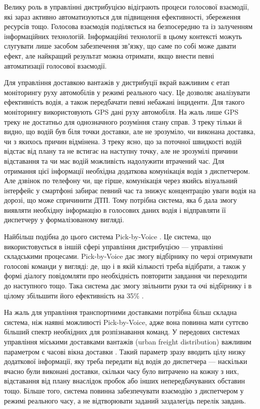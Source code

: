 Велику роль в управлінні дистрибуцією відіграють процеси голосової взаємодії, які зараз активно автоматизуються для підвищення ефективності, збереження ресурсів тощо. Голосова взаємодія поділяється на безпосередню та із залученням інформаційних технологій. Інформаційні технології в цьому контексті можуть слугувати лише засобом забезпечення звʼязку, що саме по собі може давати ефект, але найкращий результат можна отримати, якщо внести певні автоматизації голосової взаємодії.

Для управління доставкою вантажів у дистрибуції вкрай важливим є етап моніторингу руху автомобілів у режимі реального часу. Це дозволяє аналізувати ефективність водія, а також передбачати певні небажані інциденти. Для такого моніторингу використовують GPS дані руху автомобіля\cite{Gonzalez_2013,Comendador_2012}. На жаль лише GPS треку не достатньо для однозначного розуміння стану справ. З треку тільки й видно, що водій був біля точки доставки, але не зрозуміло, чи виконана доставка, чи з якихось причин відмінена. З треку ясно, що за поточної швидкості водій відстає від плану та не встигає на наступну точку, але не зрозумілі причини відставання та чи має водій можливість надолужити втрачений час. Для отримання цієї інформації необхідна додаткова комунікація водія з диспетчером. Але дзвінок по телефону чи, ще гірше, комунікація через якийсь візуальний інтерфейс у смартфоні забирає певний час та знижує концентрацію уваги водія на дорозі, що може спричинити ДТП. Тому потрібна система, яка б дала змогу виявляти необхідну інформацію в голосових даних водія і відправляти її диспетчеру у формалізованому вигляді.

Найбільш подібна до цього система Pick-by-Voice \cite{Pick-to-Voice}. Це система, що використовується в іншій сфері управління дистрибуцією — управлінні складськими процесами. Pick-by-Voice дає змогу відбірнику по черзі отримувати голосові команди у вигляді: де, що і в якій кількості треба відібрати, а також у формі діалогу повідомляти про необхідність повторити завдання чи переходити до наступного тощо. Така система дає змогу звільнити руки та очі відбірнику і в цілому збільшити його ефективність на 35\% \cite{Baumann_2012}.

На жаль для управління транспортними доставками потрібна більш складна система, ніж наявні можливості Pick-by-Voice, адже вона повинна мати суттєво більший спектр необхідних для розпізнавання команд. У передових системах управління міськими доставками вантажів (urban freight distribution) важливим параметром є часові вікна доставки \cite{Quak_2006}. Такий параметр зразу вводить цілу низку додаткової інформації, яку треба передати від водія до диспетчера — наскільки вчасно були виконані доставки, скільки часу було витрачено на кожну з них, відставання від плану внаслідок пробок або інших непередбачуваних обставин тощо. Більше того, система повинна забезпечувати взаємодію з диспетчером у режимі реального часу, а не відтворювати заданий заздалегідь перелік завдань.


